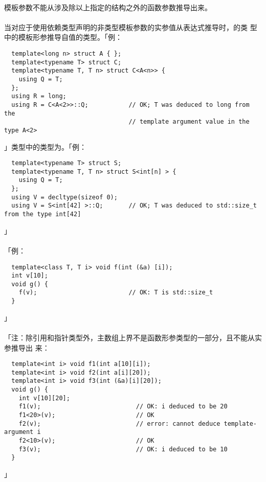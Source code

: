 \paragraph{}
模板参数不能从涉及除以上指定的结构之外的函数参数推导出来。

\paragraph{}
当对应于使用依赖类型声明的非类型模板参数的实参值从表达式推导时，的类
型中的模板形参推导自值的类型。「例：
\begin{lstlisting}
  template<long n> struct A { };
  template<typename T> struct C;
  template<typename T, T n> struct C<A<n>> {
    using Q = T;
  };
  using R = long;
  using R = C<A<2>>::Q;           // OK; T was deduced to long from the
                                  // template argument value in the type A<2>
\end{lstlisting}」类型中的类型为。「例：
\begin{lstlisting}
  template<typename T> struct S;
  template<typename T, T n> struct S<int[n] > {
    using Q = T;
  };
  using V = decltype(sizeof 0);
  using V = S<int[42] >::Q;       // OK; T was deduced to std::size_t from the type int[42]
\end{lstlisting}」

\paragraph{}
「例：
\begin{lstlisting}
  template<class T, T i> void f(int (&a) [i]);
  int v[10];
  void g() {
    f(v);                         // OK: T is std::size_t
  }
\end{lstlisting}」

\paragraph{}
「注：除引用和指针类型外，主数组上界不是函数形参类型的一部分，且不能从实参推导出
来：
\begin{lstlisting}
  template<int i> void f1(int a[10][i]);
  template<int i> void f2(int a[i][20]);
  template<int i> void f3(int (&a)[i][20]);
  void g() {
    int v[10][20];
    f1(v);                          // OK: i deduced to be 20
    f1<20>(v);                      // OK
    f2(v);                          // error: cannot deduce template-argument i
    f2<10>(v);                      // OK
    f3(v);                          // OK: i deduced to be 10
  }
\end{lstlisting}」

